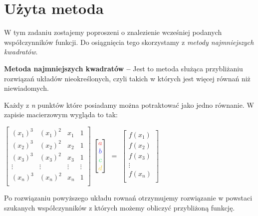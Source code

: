 \documentclass{article}
\begin{document}
  \section{Użyta metoda}
  W tym zadaniu zostajemy poproszeni o znalezienie wcześniej podanych współczynników funkcji. Do osiągnięcia tego skorzystamy z \textit{metody najmniejszych kwadratów}.

  \textbf{Metoda najmniejszych kwadratów --} Jest to metoda służąca przybliżaniu rozwiązań układów nieokreślonych, czyli takich w których jest więcej równań niż niewiadomych.
  
  Każdy z \textit{n} punktów które posiadamy można potraktować jako jedno równanie. W zapisie macierzowym wygląda to tak:

  \begin{center}
    $\begin{bmatrix}
      (x_1)^3 & (x_1)^2 & x_1 & 1 \\
      (x_2)^3 & (x_2)^2 & x_2 & 1 \\
      (x_3)^3 & (x_3)^2 & x_3 & 1 \\
      \vdots & \vdots & \vdots & \vdots \\
      (x_n)^3 & (x_n)^2 & x_n & 1 \\
    \end{bmatrix}$
  $\begin{bmatrix}
    \textcolor{red}{a} \\
    \textcolor{blue}{b} \\
    \textcolor{green}{c} \\ 
    \textcolor{yellow}{d} \\
  \end{bmatrix}$
  $=$
  $\begin{bmatrix}
    f(x_1) \\
    f(x_2)\\
    f(x_3)\\
    \vdots \\
    f(x_n)\\
  \end{bmatrix}$
\end{center}

Po rozwiązaniu powyższego układu rownań otrzymujemy rozwiązanie w powstaci szukanych współczynników z których możemy obliczyć przybliżoną funkcję.
\end{document}
